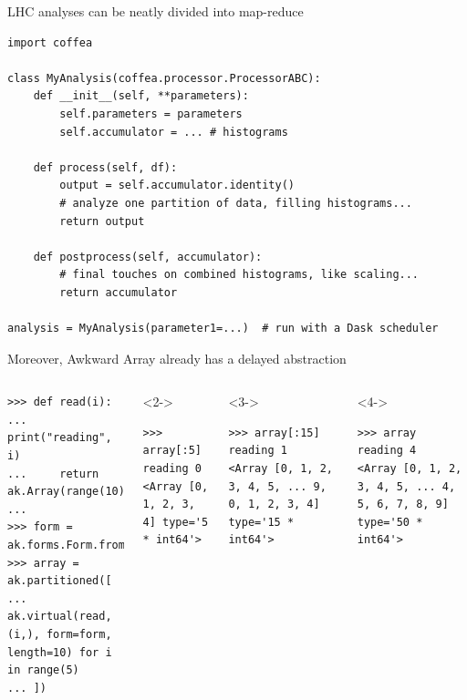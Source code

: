 \documentclass[aspectratio=169]{beamer}
\begin{document}
\begin{frame}[fragile]{LHC analyses can be neatly divided into map-reduce}
\vspace{0.25 cm}
\small
\begin{verbatim}
import coffea

class MyAnalysis(coffea.processor.ProcessorABC):
    def __init__(self, **parameters):
        self.parameters = parameters
        self.accumulator = ... # histograms

    def process(self, df):
        output = self.accumulator.identity()
        # analyze one partition of data, filling histograms...
        return output

    def postprocess(self, accumulator):
        # final touches on combined histograms, like scaling...
        return accumulator

analysis = MyAnalysis(parameter1=...)  # run with a Dask scheduler
\end{verbatim}
\end{frame}

\begin{frame}[fragile]{Moreover, Awkward Array already has a delayed abstraction}
\small
\begin{columns}
\begin{verbatim}
>>> def read(i):
...     print("reading", i)
...     return ak.Array(range(10))
... 
>>> form = ak.forms.Form.from_numpy(np.dtype(np.int64))
>>> array = ak.partitioned([
...     ak.virtual(read, (i,), form=form, length=10) for i in range(5)
... ])
\end{verbatim}
\vspace{-0.3 cm}
\begin{uncoverenv}<2->
\begin{verbatim}
>>> array[:5]
reading 0
<Array [0, 1, 2, 3, 4] type='5 * int64'>
\end{verbatim}
\end{uncoverenv}
\begin{uncoverenv}<3->
\vspace{-0.3 cm}
\begin{verbatim}
>>> array[:15]
reading 1
<Array [0, 1, 2, 3, 4, 5, ... 9, 0, 1, 2, 3, 4] type='15 * int64'>
\end{verbatim}
\end{uncoverenv}
\vspace{-0.3 cm}
\begin{uncoverenv}<4->
\begin{verbatim}
>>> array
reading 4
<Array [0, 1, 2, 3, 4, 5, ... 4, 5, 6, 7, 8, 9] type='50 * int64'>
\end{verbatim}
\end{uncoverenv}
\end{columns}
\end{frame}
\end{document}
